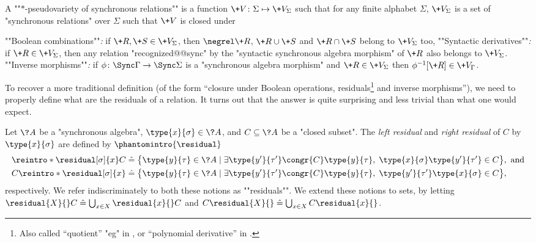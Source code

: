 A \AP""$\ast$-pseudovariety of synchronous relations"" is a function $\+V \colon \Sigma \mapsto \+V_\Sigma$
such that for any finite alphabet $\Sigma$, $\+V_\Sigma$ is a set of "synchronous relations" over 
$\Sigma$ such that $\+V$ is closed under
\begin{itemize}
	\itemAP ""Boolean combinations""\emph{:} if $\+R, \+S \in \+V_{\Sigma}$, then
		$\negrel\+R$, $\+R \cup \+S$ and $\+R \cap \+S$ belong to $\+V_{\Sigma}$ too,
	\itemAP ""Syntactic derivatives""\emph{:} if $\+R \in \+V_{\Sigma}$, then any relation
	"recognized@@sync" by the "syntactic synchronous algebra morphism" of $\+R$ also belongs
	to $\+V_{\Sigma}$.
	\itemAP ""Inverse morphisms""\emph{:} if $\phi\colon \Sync\Gamma \to \Sync\Sigma$ is
		a "synchronous algebra morphism" and $\+R \in \+V_{\Sigma}$ then
		$\phi^{-1}[\+R] \in \+V_{\Gamma}$. 
\end{itemize}

To recover a more traditional definition (of the form ``closure under Boolean operations, residuals\footnote{Also called ``quotient'' "eg" in \cite[\S III.1.3, p.~39]{Pin2022MathematicalFoundations}, or ``polynomial derivative'' in \cite[\S 4, p.~19]{Bojanczyk2015Recognisable}.} and inverse morphisms''), we need to properly define what are the residuals of a relation. It 
turns out that the answer is quite surprising and less trivial than what one would expect.

\begin{definition}[Residuals]
	\AP\label{def:residuals}
	Let $\?A$ be a "synchronous algebra", $\type{x}{\sigma} \in \?A$,
	and $C \subseteq \?A$ be a "closed subset".
	The \emph{left residual} and \emph{right residual} of $C$ by $\type{x}{\sigma}$ are defined by
	$\phantomintro{\residual}$
	\begin{align*}
		\reintro*\residual[\sigma]{x} C & \defeq
		\bigl\{
			\type{y}{\tau} \in \?A \mid
				\exists \type{y'}{\tau'} \congr{C} \type{y}{\tau},\;
				\type{x}{\sigma} \type{y'}{\tau'} \in C
		\bigr\}, \text{ and} \\
		C\reintro*\residual[\sigma]{x} & \defeq
		\bigl\{
			\type{y}{\tau} \in \?A \mid
				\exists \type{y'}{\tau'} \congr{C} \type{y}{\tau},\;
				\type{y'}{\tau'}\type{x}{\sigma} \in C
		\bigr\},
	\end{align*}
	respectively. We refer indiscriminately to both these notions as \AP""residuals"".
	We extend these notions to sets, by letting
	$\residual{X}{}C \defeq \bigcup_{x\in X}\residual{x}{}C$
	and $C\residual{X}{} \defeq \bigcup_{x\in X} C\residual{x}{}$.
\end{definition}

